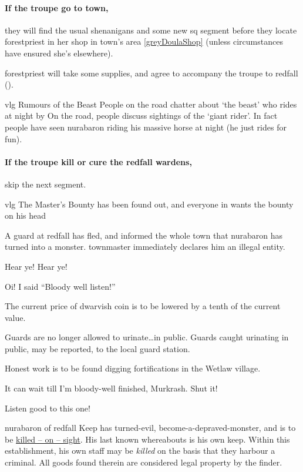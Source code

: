 \thornSeneschal

\label{thorn}

\paragraph{If the troupe go to \gls{town},}
they will find the usual shenanigans and some new \gls{sq} \gls{segment} before they locate \gls{forestpriest} in her shop in \gls{town}'s area \vref{greyDoulaShop} (unless circumstances have ensured she's elsewhere).

\Gls{forestpriest} will take some supplies, and agree to accompany the troupe to \gls{redfall} ().

{\gls{vlg} Rumours of the Beast}%
{People on the road chatter about `the beast' who rides at night by }%
On the road, people discuss sightings of the `giant rider'.
In fact people have seen \gls{nurabaron} riding his massive horse at night (he just rides for fun).

\paragraph{If the troupe kill or cure the \gls{redfall} \glspl{warden},}
skip the next \gls{segment}.

{\gls{vlg} The Master's Bounty}%
{ has been found out, and everyone in  wants the bounty on his head}%
\label{mastersBounty}

A guard at \gls{redfall} has fled, and informed the whole town that \gls{nurabaron} has turned into a monster.
\Gls{townmaster} immediately declares him an illegal entity.

\begin{speechtext}
    Hear ye! Hear ye!

    Oi! I said ``Bloody well listen!''

    The current price of dwarvish coin is to be lowered by a tenth of the current value.

    Guards are no longer allowed to urinate\ldots in public.
    Guards caught urinating in public, may be reported, to the local {\footnotesize guard station}.

    Honest work is to be found digging fortifications in the Wetlaw village.

    It can wait till I'm bloody-well finished, Murkrash.
    Shut it!

    Listen good to this one!

    \Gls{nurabaron} of \gls{redfall} Keep has turned-evil, become-a-depraved-monster, and is to be \underline{\large killed -- on -- sight}.
    His last known whereabouts is his own keep.
    Within this establishment, his own staff may be \emph{killed} on the basis that they harbour a criminal.
    All goods found therein are considered legal property by the finder.
\end{speechtext}

